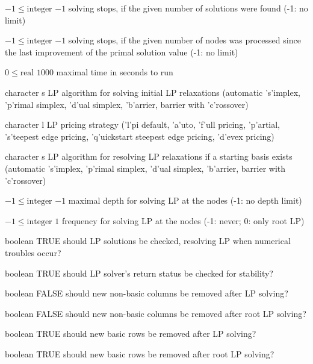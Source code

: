 %
{$-1\leq\textrm{integer}$}%
{$-1$}%
{solving stops, if the given number of solutions were found (-1: no limit)}%
{}

%
{$-1\leq\textrm{integer}$}%
{$-1$}%
{solving stops, if the given number of nodes was processed since the last improvement of the primal solution value (-1: no limit)}%
{}

%
{$0\leq\textrm{real}$}%
{$1000$}%
{maximal time in seconds to run}%
{}

%
{character}%
{s}%
{LP algorithm for solving initial LP relaxations (automatic 's'implex, 'p'rimal simplex, 'd'ual simplex, 'b'arrier, barrier with 'c'rossover)}%
{}

%
{character}%
{l}%
{LP pricing strategy ('l'pi default, 'a'uto, 'f'ull pricing, 'p'artial, 's'teepest edge pricing, 'q'uickstart steepest edge pricing, 'd'evex pricing)}%
{}

%
{character}%
{s}%
{LP algorithm for resolving LP relaxations if a starting basis exists (automatic 's'implex, 'p'rimal simplex, 'd'ual simplex, 'b'arrier, barrier with 'c'rossover)}%
{}

%
{$-1\leq\textrm{integer}$}%
{$-1$}%
{maximal depth for solving LP at the nodes (-1: no depth limit)}%
{}

%
{$-1\leq\textrm{integer}$}%
{$1$}%
{frequency for solving LP at the nodes (-1: never; 0: only root LP)}%
{}

%
{boolean}%
{TRUE}%
{should LP solutions be checked, resolving LP when numerical troubles occur?}%
{}

%
{boolean}%
{TRUE}%
{should LP solver's return status be checked for stability?}%
{}

%
{boolean}%
{FALSE}%
{should new non-basic columns be removed after LP solving?}%
{}

%
{boolean}%
{FALSE}%
{should new non-basic columns be removed after root LP solving?}%
{}

%
{boolean}%
{TRUE}%
{should new basic rows be removed after LP solving?}%
{}

%
{boolean}%
{TRUE}%
{should new basic rows be removed after root LP solving?}%
{}


